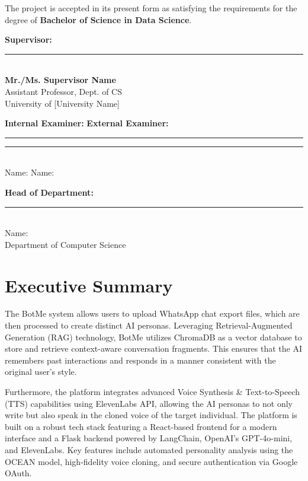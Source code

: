 \documentclass[12pt,a4paper]{report}
\begin{document}
The project is accepted in its present form as satisfying the requirements for the degree of \textbf{Bachelor of Science in Data Science}.

\vspace{1.5cm}

\textbf{Supervisor:} \\
\rule{7cm}{0.4pt} \\
\textbf{Mr./Ms. Supervisor Name} \\
Assistant Professor, Dept. of CS \\
University of [University Name]

\vspace{1.5cm}

\textbf{Internal Examiner:} \hfill \textbf{External Examiner:} \\
\rule{7cm}{0.4pt} \hfill \rule{7cm}{0.4pt} \\
Name: \hfill Name:

\vspace{1.5cm}

\textbf{Head of Department:} \\
\rule{7cm}{0.4pt} \\
Name: \\
Department of Computer Science

\newpage

\chapter*{Executive Summary}

The BotMe system allows users to upload WhatsApp chat export files, which are then processed to create distinct AI personas. Leveraging Retrieval-Augmented Generation (RAG) technology, BotMe utilizes ChromaDB as a vector database to store and retrieve context-aware conversation fragments. This ensures that the AI remembers past interactions and responds in a manner consistent with the original user's style. 

Furthermore, the platform integrates advanced Voice Synthesis \& Text-to-Speech (TTS) capabilities using ElevenLabs API, allowing the AI personas to not only write but also speak in the cloned voice of the target individual. The platform is built on a robust tech stack featuring a React-based frontend for a modern interface and a Flask backend powered by LangChain, OpenAI's GPT-4o-mini, and ElevenLabs. Key features include automated personality analysis using the OCEAN model, high-fidelity voice cloning, and secure authentication via Google OAuth.
\end{document}
